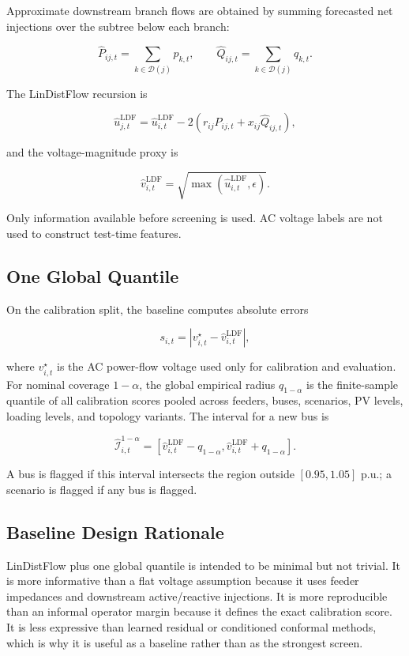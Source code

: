 \documentclass[
  journal]{IEEEtran}
\begin{document}
Approximate downstream branch flows are obtained by summing forecasted
net injections over the subtree below each branch:

\[
\widehat P_{ij,t}=\sum_{k\in\mathcal{D}(j)}p_{k,t}, \qquad
\widehat Q_{ij,t}=\sum_{k\in\mathcal{D}(j)}q_{k,t}.
\]

The LinDistFlow recursion is

\[
\hat u_{j,t}^{\mathrm{LDF}} =
\hat u_{i,t}^{\mathrm{LDF}}
-2(r_{ij}\widehat P_{ij,t}+x_{ij}\widehat Q_{ij,t}),
\]

and the voltage-magnitude proxy is

\[
\hat v_{i,t}^{\mathrm{LDF}}
=\sqrt{\max(\hat u_{i,t}^{\mathrm{LDF}},\epsilon)}.
\]

Only information available before screening is used. AC voltage labels
are not used to construct test-time features.

\subsection{One Global Quantile}\label{one-global-quantile}

On the calibration split, the baseline computes absolute errors

\[
s_{i,t} =
\left|v^\star_{i,t}-\hat v_{i,t}^{\mathrm{LDF}}\right|,
\]

where \(v^\star_{i,t}\) is the AC power-flow voltage used only for
calibration and evaluation. For nominal coverage \(1-\alpha\), the
global empirical radius \(q_{1-\alpha}\) is the finite-sample quantile
of all calibration scores pooled across feeders, buses, scenarios, PV
levels, loading levels, and topology variants. The interval for a new
bus is

\[
\widehat{\mathcal I}_{i,t}^{1-\alpha}
=
\left[
\hat v_{i,t}^{\mathrm{LDF}}-q_{1-\alpha},
\hat v_{i,t}^{\mathrm{LDF}}+q_{1-\alpha}
\right].
\]

A bus is flagged if this interval intersects the region outside
\([0.95,1.05]\) p.u.; a scenario is flagged if any bus is flagged.

\subsection{Baseline Design Rationale}\label{baseline-design-rationale}

LinDistFlow plus one global quantile is intended to be minimal but not
trivial. It is more informative than a flat voltage assumption because
it uses feeder impedances and downstream active/reactive injections. It
is more reproducible than an informal operator margin because it defines
the exact calibration score. It is less expressive than learned residual
or conditioned conformal methods, which is why it is useful as a
baseline rather than as the strongest screen.
\end{document}
